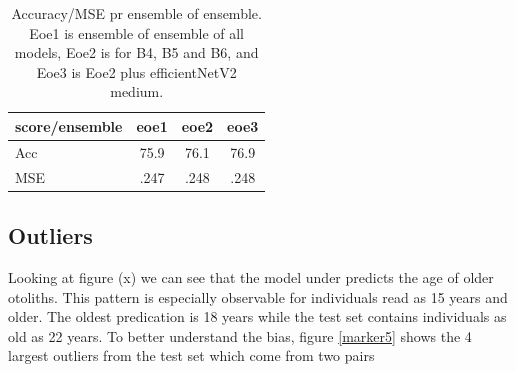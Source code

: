 \documentclass[10pt,letterpaper]{article}
\begin{document}
\begin{center}
\begin{table}[hbt!]
\caption{Accuracy/MSE pr ensemble of ensemble.
Eoe1 is ensemble of ensemble of all models, Eoe2 is for B4, B5 and B6,
and Eoe3 is Eoe2 plus efficientNetV2 medium.}
\begin{tabular}{ |l|c|c|c| }
\hline
score/ensemble & eoe1 & eoe2 & eoe3  \\ \hline
Acc & 75.9 & 76.1 & 76.9 \\ 
MSE & .247 & .248 & .248  \\ 
\hline
\end{tabular}
\end{table}
\end{center}



\subsection*{Outliers}

Looking at figure (x) we can see that the model under predicts the age of older otoliths. This pattern is especially observable for individuals read as 15 years and older. The oldest predication is 18 years while the test set contains individuals as old as 22 years. To better understand the bias, figure \ref{marker5} shows the 4 largest outliers from the test set which come from two pairs
\end{document}
